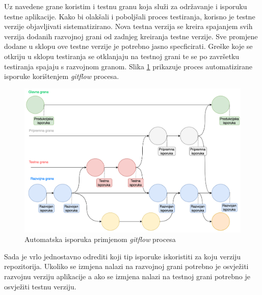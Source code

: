 \documentclass[times, utf8, diplomski, numeric]{fer}
\begin{document}
Uz navedene grane koristim i testnu granu koja služi za održavanje i isporuku testne aplikacije. Kako bi olakšali i poboljšali proces testiranja, korisno je testne verzije objavljivati sistematizirano. Nova testna verzija se kreira spajanjem svih verzija dodanih razvojnoj grani od zadnjeg kreiranja testne verzije. Sve promjene dodane u sklopu ove testne verzije je potrebno jasno specficirati. Greške koje se otkriju u sklopu testiranja se otklanjaju na testnoj grani te se po završetku testiranja spajaju s razvojnom granom. Slika \ref{fig:GitFlowCD} prikazuje proces automatizirane isporuke korištenjem \textit{gitflow} procesa.

\begin{figure}[t!]
\centering
\includegraphics[scale=0.5]{GitFlowCD}
\caption{Automatska isporuka primjenom \textit{gitflow} procesa}
\label{fig:GitFlowCD}
\end{figure}

Sada je vrlo jednostavno odrediti koji tip isporuke iskoristiti za koju verziju repozitorija. Ukoliko se izmjena nalazi na razvojnoj grani potrebno je osvježiti razvojnu verziju aplikacije a ako se izmjena nalazi na testnoj grani potrebno je osvježiti testnu verziju.
\end{document}
